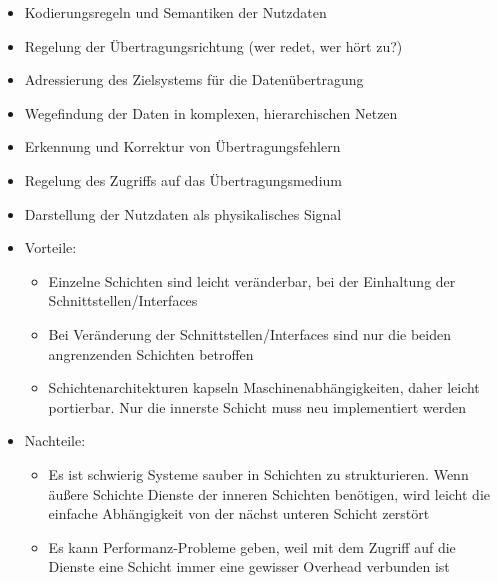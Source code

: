 \begin{itemize}
    \item Kodierungsregeln und Semantiken der Nutzdaten
    \item Regelung der Übertragungsrichtung (wer redet, wer hört zu?)\
    \item Adressierung des Zielsystems für die Datenübertragung
    \item Wegefindung der Daten in komplexen, hierarchischen Netzen
    \item Erkennung und Korrektur von Übertragungsfehlern
    \item Regelung des Zugriffs auf das Übertragungsmedium
    \item Darstellung der Nutzdaten als physikalisches Signal
\end{itemize}

\begin{itemize}
    \item Vorteile:
    \begin{itemize}
        \item Einzelne Schichten sind leicht veränderbar, bei der Einhaltung der Schnittstellen/Interfaces
        \item Bei Veränderung der Schnittstellen/Interfaces sind nur die beiden angrenzenden Schichten betroffen
        \item Schichtenarchitekturen kapseln Maschinenabhängigkeiten, daher leicht portierbar.
        Nur die innerste Schicht muss neu implementiert werden
    \end{itemize}
    \item Nachteile:
    \begin{itemize}
        \item Es ist schwierig Systeme sauber in Schichten zu strukturieren.
        Wenn äußere Schichte Dienste der inneren Schichten benötigen, wird leicht die einfache Abhängigkeit von der nächst unteren Schicht zerstört
        \item Es kann Performanz-Probleme geben, weil mit dem Zugriff auf die Dienste eine Schicht immer eine gewisser Overhead verbunden ist
    \end{itemize}
\end{itemize}

